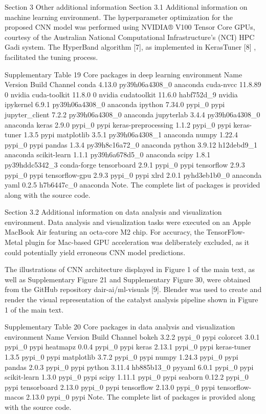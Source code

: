 Section 3 Other additional information
Section 3.1 Additional information on machine learning environment.
The hyperparameter optimization for the proposed CNN model was performed using NVIDIA® V100 Tensor Core GPUs, courtesy of the Australian National Computational Infrastructure's (NCI) HPC Gadi system. The HyperBand algorithm [7], as implemented in KerasTuner [8] , facilitated the tuning process.

Supplementary Table 19
Core packages in deep learning environment
Name	Version	Build	Channel
conda	4.13.0	py39h06a4308_0	anaconda
cuda-nvcc	11.8.89	0	nvidia
cuda-toolkit	11.8.0	0	nvidia
cudatoolkit	11.6.0	habf752d_9	nvidia
ipykernel	6.9.1	py39h06a4308_0	anaconda
ipython	7.34.0	pypi_0	pypi
jupyter_client	7.2.2	py39h06a4308_0	anaconda
jupyterlab	3.4.4	py39h06a4308_0	anaconda
keras	2.9.0	pypi_0	pypi
keras-preprocessing	1.1.2	pypi_0	pypi
keras-tuner	1.3.5		pypi
matplotlib	3.5.1	py39h06a4308_1	anaconda
numpy	1.22.4	pypi_0	pypi
pandas	1.3.4	py39h8c16a72_0	anaconda
python	3.9.12	h12debd9_1	anaconda
scikit-learn	1.1.1	py39h6a678d5_0	anaconda
scipy	1.8.1	py39hddc5342_3	conda-forge
tensorboard	2.9.1	pypi_0	pypi
tensorflow	2.9.3	pypi_0	pypi
tensorflow-gpu	2.9.3	pypi_0	pypi
xlrd	2.0.1	pyhd3eb1b0_0	anaconda
yaml	0.2.5	h7b6447c_0	anaconda
Note. The complete list of packages is provided along with the source code.

Section 3.2 Additional information on data analysis and visualization environment.
Data analysis and visualization tasks were executed on an Apple MacBook Air featuring an octa-core M2 chip. For accuracy, the TensorFlow-Metal plugin for Mac-based GPU acceleration was deliberately excluded, as it could potentially yield erroneous CNN model predictions.

The illustrations of CNN architecture displayed in Figure 1 of the main text, as well as  Supplementary Figure 21 and Supplementary Figure 30, were obtained from the GitHub repository dair-ai/ml-visuals [9]. Blender was used to create and render the visual representation of the catalyst analysis pipeline shown in Figure 1 of the main text.

Supplementary Table 20
Core packages in data analysis and visualization environment
Name	Version	Build	Channel
bokeh	3.2.2	pypi_0	pypi
colorcet	3.0.1	pypi_0	pypi
heatmapz	0.0.4	pypi_0	pypi
keras	2.13.1	pypi_0	pypi
keras-tuner	1.3.5	pypi_0	pypi
matplotlib	3.7.2	pypi_0	pypi
numpy	1.24.3	pypi_0	pypi
pandas	2.0.3	pypi_0	pypi
python	3.11.4	hb885b13_0
pyyaml	6.0.1	pypi_0	pypi
scikit-learn	1.3.0	pypi_0	pypi
scipy	1.11.1	pypi_0	pypi
seaborn	0.12.2	pypi_0	pypi
tensorboard	2.13.0	pypi_0	pypi
tensorflow	2.13.0	pypi_0	pypi
tensorflow-macos	2.13.0	pypi_0	pypi
Note. The complete list of packages is provided along with the source code.
